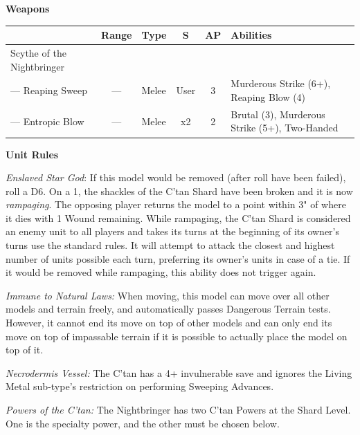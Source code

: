 \begin{minipage}[t]{0.72\textwidth}
	\vspace*{2em}
	\textbf{Weapons}
	
	\begin{tabular}{L{90 pt} c C{40pt} *{2}{c} >{\raggedright\arraybackslash}p{130pt}}
		& Range & Type & S & AP & Abilities \\
		\hline
		Scythe of the Nightbringer & & & & & \\
		— Reaping Sweep & — & Melee & User & 3 & Murderous Strike (6+), Reaping Blow (4) \\
		— Entropic Blow & — & Melee & x2 & 2 & Brutal (3), Murderous Strike (5+), Two-Handed \\
	\end{tabular}
	
	\vspace*{2em}
	\textbf{Unit Rules}
		
	\textit{Enslaved Star God}: If this model would be removed (after  roll have been failed), roll a D6. On a 1, the shackles of the C'tan Shard have been broken and it is now \textit{rampaging}. The opposing player returns the model to a point within 3" of where it dies with 1 Wound remaining. While rampaging, the C'tan Shard is considered an enemy unit to all players and takes its turns at the beginning of its owner's turns use the standard rules. It will attempt to attack the closest and highest number of units possible each turn, preferring its owner's units in case of a tie. If it would be removed while rampaging, this ability does not trigger again.
	
	\textit{Immune to Natural Laws:} When moving, this model can move over all other models and terrain freely, and automatically passes Dangerous Terrain tests. However, it cannot end its move on top of other models and can only end its move on top of impassable terrain if it is possible to actually place the model on top of it.
	
	\textit{Necrodermis Vessel:} The C'tan has a 4+ invulnerable save and ignores the Living Metal sub-type's restriction on performing Sweeping Advances.
	
	\textit{Powers of the C'tan:} The Nightbringer has two C'tan Powers at the Shard Level. One is the  specialty power, and the other must be chosen below.
	

\end{minipage}
